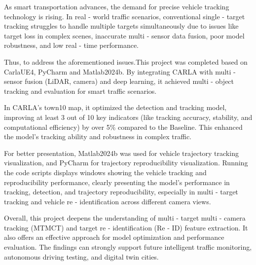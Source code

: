 \begin{abstracten}

As smart transportation advances, the demand for precise vehicle tracking technology is rising. In real - world traffic scenarios, conventional single - target tracking struggles to handle multiple targets simultaneously due to issues like target loss in complex scenes, inaccurate multi - sensor data fusion, poor model robustness, and low real - time performance.

Thus, to address the aforementioned issues.This project was completed based on CarlaUE4, PyCharm and Matlab2024b. By integrating CARLA with multi - sensor fusion (LiDAR, camera) and deep learning, it achieved multi - object tracking and evaluation for smart traffic scenarios. 

In CARLA's town10 map, it optimized the detection and tracking model, improving at least 3 out of 10 key indicators (like tracking accuracy, stability, and computational efficiency) by over 5\% compared to the Baseline. This enhanced the model's tracking ability and robustness in complex traffic.

For better presentation, Matlab2024b was used for vehicle trajectory tracking visualization, and PyCharm for trajectory reproducibility visualization. Running the code scripts displays windows showing the vehicle tracking and reproducibility performance, clearly presenting the model's performance in tracking, detection, and trajectory reproducibility, especially in multi - target tracking and vehicle re - identification across different camera views.

Overall, this project deepens the understanding of multi - target multi - camera tracking (MTMCT) and target re - identification (Re - ID) feature extraction. It also offers an effective approach for model optimization and performance evaluation. The findings can strongly support future intelligent traffic monitoring, autonomous driving testing, and digital twin cities.



\end{abstracten}
